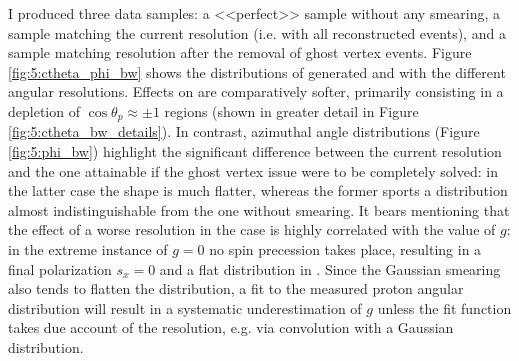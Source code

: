 I produced three data samples:
a <<perfect>> sample without any smearing, a sample matching the current resolution (i.e. with all reconstructed \demonstratorshort events), and a sample matching resolution after the removal of ghost vertex events.
Figure \ref{fig:5:ctheta_phi_bw} shows the distributions of generated \cthetap and \phip with the different angular resolutions.
Effects on \cthetap are comparatively softer, primarily consisting in a depletion of $\cos\theta_p \approx \pm 1$ regions (shown in greater detail in Figure \ref{fig:5:ctheta_bw_details}).
In contrast, azimuthal angle \phip distributions (Figure \ref{fig:5:phi_bw}) highlight the significant difference between the current resolution and the one attainable if the ghost vertex issue were to be completely solved:
in the latter case the shape is much flatter, whereas the former sports a distribution almost indistinguishable from the one without smearing.
It bears mentioning that the effect of a worse resolution in the \phip case is highly correlated with the value of $g$:
in the extreme instance of $g=0$ no spin precession takes place, resulting in a final polarization $s_x = 0$ and a flat distribution in \phip.
Since the Gaussian smearing also tends to flatten the \phip distribution, a fit to the measured proton angular distribution will result in a systematic underestimation of $g$ unless the fit function takes due account of the resolution, e.g. via convolution with a Gaussian distribution.

